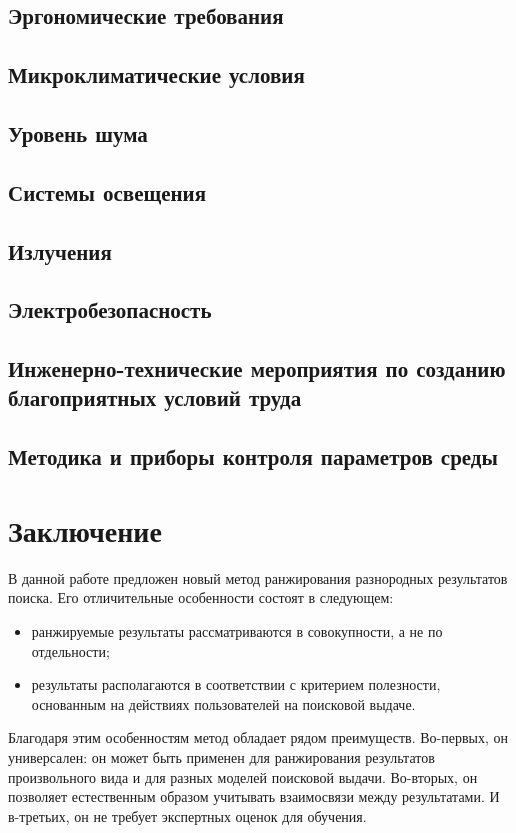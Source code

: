 \documentclass[12pt,a4paper]{report}
\begin{document}
\section{Эргономические требования}
\section{Микроклиматические условия}
\section{Уровень шума}
\section{Системы освещения}
\section{Излучения}
\section{Электробезопасность}
\section{Инженерно-технические мероприятия по созданию благоприятных условий труда}
\section{Методика и приборы контроля параметров среды}

\chapter*{Заключение}

В данной работе предложен новый метод ранжирования разнородных результатов поиска. Его отличительные особенности состоят в следующем:
\begin{itemize}
  \item ранжируемые результаты рассматриваются в совокупности, а не по отдельности;
  \item результаты располагаются в соответствии с критерием полезности, основанным на действиях пользователей на поисковой выдаче. %
\end{itemize}
Благодаря этим особенностям метод обладает рядом преимуществ. Во-первых, он универсален: он может быть применен для ранжирования результатов произвольного вида и для разных моделей поисковой выдачи. Во-вторых, он позволяет естественным образом учитывать взаимосвязи между результатами. И в-третьих, он не требует экспертных оценок для обучения. 
\end{document}

